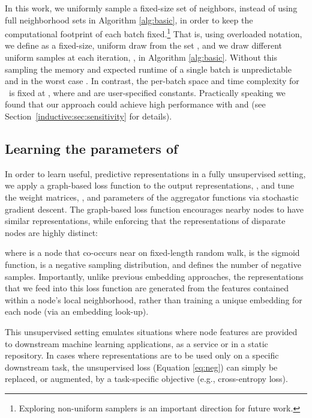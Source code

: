 In this work, we uniformly sample a fixed-size set of neighbors, instead of using full neighborhood sets in Algorithm \ref{alg:basic}, in order to keep the computational footprint of each batch fixed.\footnote{Exploring non-uniform samplers is an important direction for future work.}
That is, using overloaded notation, we define  as a fixed-size, uniform draw from the set , and we draw different uniform samples at each iteration, , in Algorithm \ref{alg:basic}. 
Without this sampling the memory and expected runtime of a single batch is unpredictable and in the worst case .
In contrast, the per-batch space and time complexity for \name\ is fixed at , where  and  are user-specified constants.
Practically speaking we found that our approach could achieve high performance with  and  (see Section~\ref{inductive:sec:sensitivity} for details).


\subsection{Learning the parameters of \name}\label{inductive:sec:learning}  
In order to learn useful, predictive representations in a fully unsupervised setting, we apply a graph-based loss function to the output representations, , and tune the weight matrices, ,  and parameters of the aggregator functions via stochastic gradient descent. 
The graph-based loss function encourages nearby nodes to have similar representations, while enforcing that the representations of disparate nodes are highly distinct:

where  is a node that co-occurs near  on fixed-length random walk,  is the sigmoid function,  is a negative sampling distribution, and  defines the number of negative samples. 
Importantly, unlike previous embedding approaches, the representations  that we feed into this loss function are generated from the features contained within a node's local neighborhood, rather than training a unique embedding for each node (via an embedding look-up). 

This unsupervised setting emulates situations where node features are provided to downstream machine learning applications, as a service or in a static repository. 
In cases where representations are to be used only on a specific downstream task, the unsupervised loss (Equation \ref{eq:neg}) can simply be replaced, or augmented, by a task-specific objective (e.g., cross-entropy loss).

